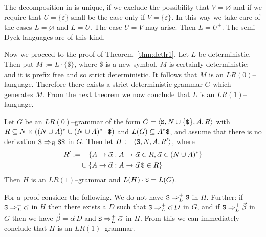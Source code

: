 The decomposition in  is unique, if we exclude the
possibility that $V = \varnothing$ and if we require that 
$U = \{\varepsilon\}$ shall be the case only if $V = \{\varepsilon\}$. 
In this way we take care of the cases $L = \varnothing$ and $L = U$.
The case $U = V$ may arise. Then $L = U^+$.
The semi Dyck languages are of this kind.

Now we proceed to the proof of Theorem~\ref{thm:detlr1}. Let
$L$ be deterministic. Then put $M := L \cdot \{\$\}$,
where \$ is a new symbol. $M$ is certainly deterministic;
and it is prefix free and so strict deterministic.
It follows that $M$ is an $LR(0)$--language. Therefore there
exists a strict deterministic grammar $G$ which generates $M$.
From the next theorem we now conclude that $L$ is an
$LR(1)$--language.
\begin{lem}
Let $G$ be an $LR(0)$--grammar of the form $G = \langle \mbox{\tt S},
N \cup \{\mbox{\tt \$}\}, A, R\rangle$ with $R \subseteq N \times ((N \cup A)^{\ast}
\cup (N \cup A)^{\ast} \cdot \mbox{\tt \$})$ and 
$L(G) \subseteq A^{\ast}\mbox{\tt \$}$, and assume that there is 
no derivation $\mbox{\tt S} \Rightarrow_R \mbox{\tt S\$}$ in $G$. Then 
let $H := \langle \mbox{\tt S}, N, A, R'\rangle$, where
\begin{align}
R' := & \phantom{\mbox{}\cup\mbox{}}
    \{A \pf \vec{\alpha} : A \pf \vec{\alpha} \in R, \vec{\alpha} \in
    (N \cup A)^{\ast}\} \\\notag
   & \cup \{A \pf \vec{\alpha} : A \pf \vec{\alpha}\, \mbox{\tt \$} \in R\}
\end{align}
Then $H$ is an $LR(1)$--grammar and $L(H)\cdot\mbox{\tt \$} = L(G)$.
\end{lem}
For a proof consider the following. We do not have
$\mbox{\tt S} \Rightarrow^+_L \mbox{\tt S}$ in $H$. Further: if
$\mbox{\tt S} \Rightarrow_L^+ \vec{\alpha}$ in $H$ then there exists
a $D$ such that $\mbox{\tt S} \Rightarrow^+_L \vec{\alpha}\, D$ in $G$,
and if $\mbox{\tt S} \Rightarrow^+_L \vec{\beta}$ in $G$ then we have
$\vec{\beta} = \vec{\alpha}\, D$ and $\mbox{\tt S} \Rightarrow ^+_L
\vec{\alpha}$ in $H$.  From this we can immediately conclude
that $H$ is an $LR(1)$--grammar.

